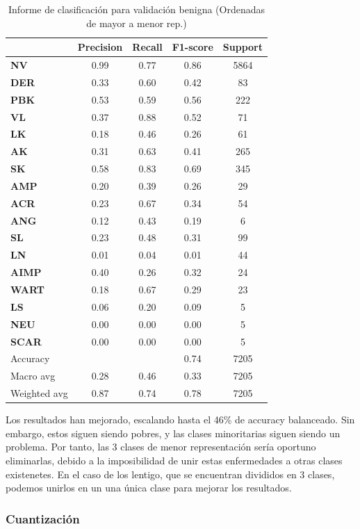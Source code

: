 \begin{table}[!ht]
	\centering
	\begin{tabular}{|l|c|c|c|c|}
		\hline
		& Precision & Recall & F1-score & Support \\
		\hline
	\textbf{NV} & 0.99 & 0.77 & 0.86 & 5864 \\ \hline
	\textbf{DER} & 0.33 & 0.60 & 0.42 & 83 \\ \hline
	\textbf{PBK} & 0.53 & 0.59 & 0.56 & 222 \\ \hline
	\textbf{VL} & 0.37 & 0.88 & 0.52 & 71 \\ \hline
	\textbf{LK} & 0.18 & 0.46 & 0.26 & 61 \\ \hline
	\textbf{AK} & 0.31 & 0.63 & 0.41 & 265 \\ \hline
	\textbf{SK} & 0.58 & 0.83 & 0.69 & 345 \\ \hline
	\textbf{AMP} & 0.20 & 0.39 & 0.26 & 29 \\ \hline
	\textbf{ACR} & 0.23 & 0.67 & 0.34 & 54 \\ \hline
	\textbf{ANG} & 0.12 & 0.43 & 0.19 & 6 \\ \hline
	\textbf{SL} & 0.23 & 0.48 & 0.31 & 99 \\ \hline
	\textbf{LN} & 0.01 & 0.04 & 0.01 & 44 \\ \hline
	\textbf{AIMP} & 0.40 & 0.26 & 0.32 & 24 \\ \hline
	\textbf{WART} & 0.18 & 0.67 & 0.29 & 23 \\ \hline
	\textbf{LS} & 0.06 & 0.20 & 0.09 & 5 \\ \hline
	\textbf{NEU} & 0.00 & 0.00 & 0.00 & 5 \\ \hline
	\textbf{SCAR} & 0.00 & 0.00 & 0.00 & 5 \\ \hline
		\hline
		Accuracy &  &  & 0.74 & 7205 \\
		Macro avg & 0.28& 0.46& 0.33&7205\\
		Weighted avg&0.87&0.74&0.78&7205\\
		\hline
	\end{tabular}
	\caption{Informe de clasificación para validación benigna (Ordenadas de mayor a menor rep.)}
	\label{tab:benignomalmejormetrics}
\end{table}

Los resultados han mejorado, escalando hasta el 46\% de accuracy balanceado. Sin embargo, estos siguen siendo pobres, y las clases minoritarias siguen siendo un problema. Por tanto, las 3 clases de menor representación sería oportuno eliminarlas, debido a la imposibilidad de unir estas enfermedades a otras clases existenetes. En el caso de los lentigo, que se encuentran divididos en 3 clases, podemos unirlos en un una única clase para mejorar los resultados.

\subsubsection{Cuantización}

